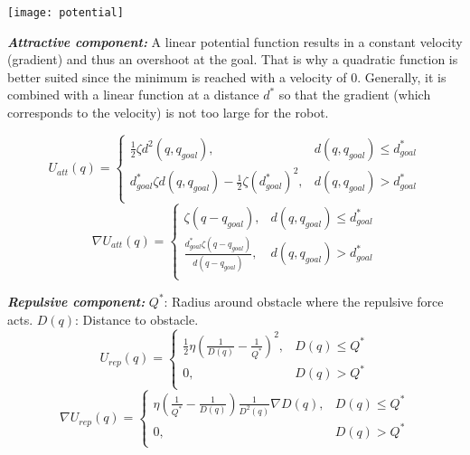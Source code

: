 \begin{multicols*}{2}
\begin{center}
	\texttt{[image: potential]}
\end{center}

\noindent \textbf{\textit{Attractive component:}} A linear potential function results in a constant velocity (gradient) and thus an overshoot at the goal.
That is why a quadratic function is better suited since the minimum is reached with a velocity of 0.
Generally, it is combined with a linear function at a distance $d^*$ so that the gradient (which corresponds to the velocity) is not too large for the robot.

\begin{equation*}
	U_{att}(q) =
	\left\{\begin{matrix}
		\frac{1}{2}\zeta d^2(q,q_{goal}), & d(q,q_{goal}) \leq d^{*}_{goal} \\
		d^{*}_{goal}\zeta d(q,q_{goal}) - \frac{1}{2}\zeta (d^{*}_{goal})^2, & d(q,q_{goal}) > d^{*}_{goal} \\
	\end{matrix}\right.
\end{equation*}
\begin{equation*}
	\nabla U_{att}(q) =
	\left\{\begin{matrix}
		\zeta (q - q_{goal}), & d(q,q_{goal}) \leq d^{*}_{goal} \\
		\frac{d^{*}_{goal}\zeta(q - q_{goal})}{d(q - q_{goal})}, & d(q,q_{goal}) > d^{*}_{goal} \\
	\end{matrix}\right.
\end{equation*}

\noindent\textit{\textbf{Repulsive component:}} $Q^{*}$: Radius around obstacle where the repulsive force acts. $D(q)$: Distance to obstacle. 
\begin{equation*}
	U_{rep}(q) =
	\left\{\begin{matrix}
		\frac{1}{2}\eta \left (\frac{1}{D(q)} - \frac{1}{Q^*}\right )^2, & D(q) \leq Q^{*} \\
		0, & D(q) > Q^{*} \\
	\end{matrix}\right.
\end{equation*}
\begin{equation*}
	\nabla U_{rep}(q) =
	\left\{\begin{matrix}
		\eta \left (\frac{1}{Q^*} - \frac{1}{D(q)}\right ) \frac{1}{D^2(q)} \nabla D(q), & D(q) \leq Q^{*} \\
		0, & D(q) > Q^{*} \\
	\end{matrix}\right.
\end{equation*}


\end{multicols*}
